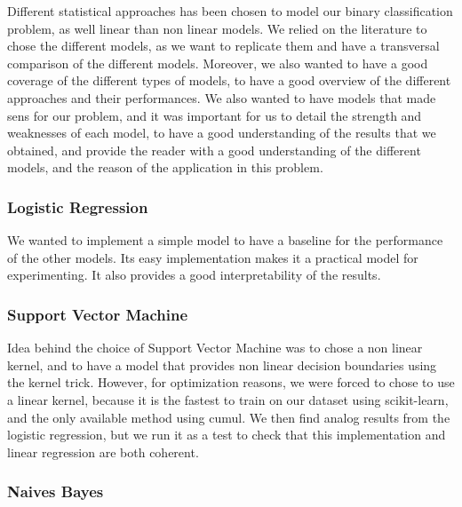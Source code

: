 \documentclass{article}
\begin{document}
    Different statistical approaches has been chosen to model our binary classification problem, as well linear than non linear models.
    We relied on the literature to chose the different models, as we want to replicate them and have a transversal comparison of the different models.
    Moreover, we also wanted to have a good coverage of the different types of models, to have a good overview of the different approaches and their performances.
    We also wanted to have models that made sens for our problem, and it was important for us to detail the strength and weaknesses of each model, to have a good understanding of the results that we obtained, and provide the reader with a good understanding of the different models, and the reason of the application in this problem.

    \subsubsection{Logistic Regression}
    We wanted to implement a simple model to have a baseline for the performance of the other models.
    Its easy implementation makes it a practical model for experimenting.
    It also provides a good interpretability of the results.

    \subsubsection{Support Vector Machine}\label{subsubsec:support-vector-machine}
    Idea behind the choice of Support Vector Machine was to chose a non linear kernel, and to have a model that provides non linear decision boundaries using the kernel trick.
    However, for optimization reasons, we were forced to chose to use a linear kernel, because it is the fastest to train on our dataset using scikit-learn, and the only available method using cumul.
    We then find analog results from the logistic regression, but we run it as a test to check that this implementation and linear regression are both coherent.

    \subsubsection{Naives Bayes}
\end{document}
